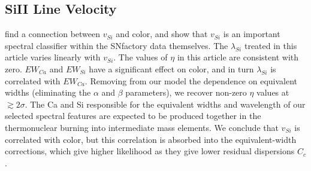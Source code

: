 \documentclass{aastex61}   	%
\begin{document}
\subsection{SiII Line Velocity}

\citet{2009ApJ...699L.139W, 2011ApJ...729...55F} find a connection between $v_{Si}$ and color, and  
\citet{2015MNRAS.447.1247S} show that $v_{Si}$ is an important spectral classifier within the SNfactory data themselves.
The $\lambda_{Si}$ treated in this article varies linearly with $v_{Si}$.
The values of $\eta$ in this article are consistent with zero.  $EW_{Ca}$ and $EW_{Si}$ have a significant effect on color,
and in turn $\lambda_{Si}$ is correlated with $EW_{Ca}$.
Removing from our model the dependence on equivalent widths (eliminating the  $\alpha$ and $\beta$ parameters), we recover
non-zero $\eta$ values at  $\gtrsim 2\sigma$.
\color{red}
The Ca and Si responsible for the equivalent widths and wavelength of our selected spectral features
are expected to be produced together in the thermonuclear burning into intermediate mass elements.
\color{black}
We conclude that $v_{Si}$ is correlated with color, 
but this correlation
is absorbed into the equivalent-width corrections, which give higher likelihood as they give lower residual dispersions $C_c$.
\end{document}
